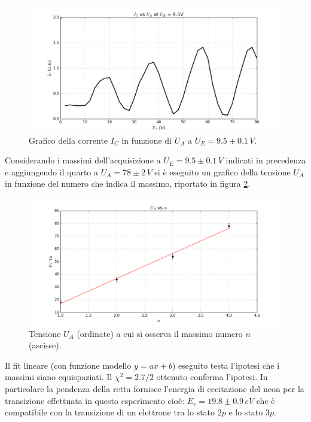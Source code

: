 \documentclass[10pt,a4paper]{article}
\begin{document}
\begin{figure}[!htb]
  \centering
  \includegraphics[scale=.5]{plot95.png}
\caption{Grafico della corrente $I_C$ in funzione di $U_A$ a $U_E = 9.5 \pm 0.1\, V$.\label{fig:grafico6}}

\end{figure}

Considerando i massimi dell'acquisizione a $U_E = 9.5 \pm 0.1\,V$ indicati in precedenza e aggiungendo il quarto a $U_A=78\pm2\,V$ si è eseguito un grafico della tensione $U_A$ in funzione del numero che indica il massimo, riportato in figura \ref{ordine}.\\ 


\begin{figure}[!htb]
  \centering
  \includegraphics[scale=.5]{ordine.png}
\caption{Tensione $U_A$ (ordinate) a cui si osserva il massimo numero $n$ (ascisse).\label{ordine}}

\end{figure}

Il fit lineare (con funzione modello $y = ax+b$) eseguito testa l'ipotesi che i massimi siano equispaziati. Il $\chi^2 = 2.7/2$ ottenuto conferma l'ipotesi. In particolare la pendenza della retta fornisce l'energia di eccitazione del neon per la transizione effettuata in questo esperimento cioè: $E_e = 19.8 \pm 0.9 \, eV$ che è compatibile con  la transizione di un elettrone tra lo stato $2p$ e lo stato $3p$.
\end{document}

